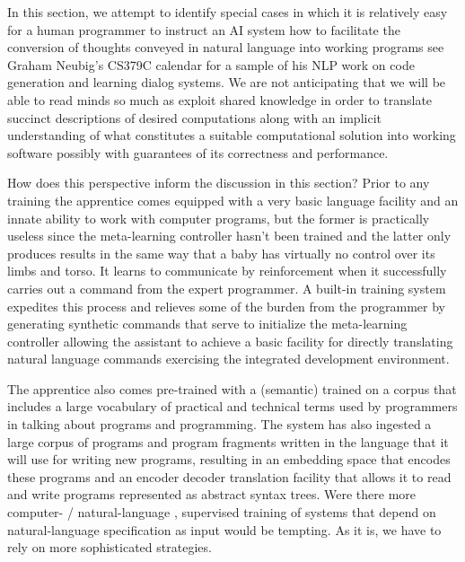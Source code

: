 In this section, we attempt to identify special cases in which it is relatively easy for a human programmer to instruct an AI system how to facilitate the conversion of thoughts conveyed in natural language into working programs \emdash{} see Graham Neubig's CS379C calendar {} for a sample of his NLP work on code generation and learning dialog systems. We are not anticipating that we will be able to read minds so much as exploit shared knowledge in order to translate succinct descriptions of desired computations \emdash{} along with an implicit understanding of what constitutes a suitable computational solution \emdash{} into working software possibly with guarantees of its correctness and performance.

How does this perspective inform the discussion in this section? Prior to any training the apprentice comes equipped with a very basic language facility and an innate ability to work with computer programs, but the former is practically useless since the meta-learning controller hasn't been trained and the latter only produces results in the same way that a baby has virtually no control over its limbs and torso. It learns to communicate by reinforcement when it successfully carries out a command from the expert programmer. A built-in training system expedites this process and relieves some of the burden from the programmer by generating synthetic commands that serve to initialize the meta-learning controller allowing the assistant to achieve a basic facility for directly translating natural language commands exercising the integrated development environment.

The apprentice also comes pre-trained with a (semantic) {} trained on a corpus that includes a large vocabulary of practical and technical terms used by programmers in talking about programs and programming. The system has also ingested a large corpus of programs and program fragments written in the language that it will use for writing new programs, resulting in an embedding space that encodes these programs and an encoder decoder translation facility that allows it to read and write programs represented as abstract syntax trees. Were there more computer- / natural-language {}, supervised training of systems that depend on natural-language specification as input would be tempting. As it is, we have to rely on more sophisticated strategies.

